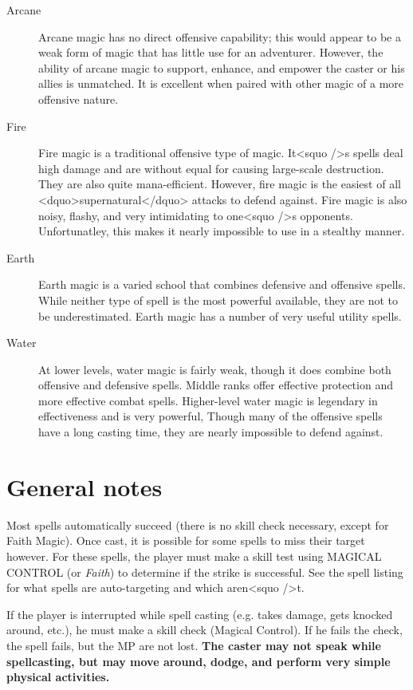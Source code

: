 \begin{description}
\item[Arcane] Arcane magic has no direct offensive capability; this
  would appear to be a weak form of magic that has little use for an
  adventurer.  However, the ability of arcane magic to support,
  enhance, and empower the caster or his allies is unmatched.  It is
  excellent when paired with other magic of a more offensive nature.

\item[Fire] Fire magic is a traditional offensive type of magic.  It<squo />s
  spells deal high damage and are without equal for causing
  large-scale destruction.  They are also quite mana-efficient.
  However, fire magic is the easiest of all <dquo>supernatural</dquo> attacks
  to defend against.  Fire magic is also noisy, flashy, and very
  intimidating to one<squo />s opponents.  Unfortunatley, this makes it
  nearly impossible to use in a stealthy manner.

\item[Earth] Earth magic is a varied school that combines defensive
  and offensive spells.  While neither type of spell is the most
  powerful available, they are not to be underestimated.  Earth magic
  has a number of very useful utility spells.

\item[Water] At lower levels, water magic is fairly weak, though it
  does combine both offensive and defensive spells.  Middle ranks
  offer effective protection and more effective combat spells.
  Higher-level water magic is legendary in effectiveness and is very
  powerful, Though many of the offensive spells have a long casting
  time, they are nearly impossible to defend against.
\end{description}

\section{General notes}

Most spells automatically succeed (there is no skill check necessary,
except for Faith Magic).  Once cast, it is possible for some spells to
miss their target however.  For these spells, the player must make a
skill test using MAGICAL CONTROL (or \emph{Faith}) to determine if the
strike is successful.  See the spell listing for what spells are
auto-targeting and which aren<squo />t.

If the player is interrupted while spell casting (e.g. takes damage,
gets knocked around, etc.), he must make a skill check (Magical
Control).  If he fails the check, the spell fails, but the MP are not
lost.  \textbf{The caster may not speak while spellcasting, but may
  move around, dodge, and perform very simple physical activities.}


